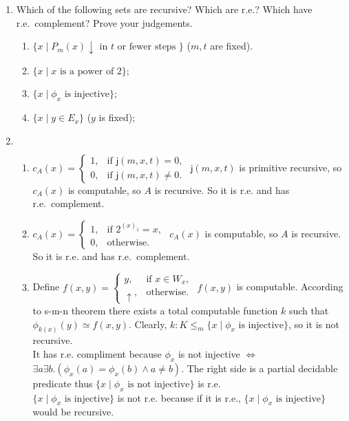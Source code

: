 \documentclass[12pt,a4paper]{article}
\makeatletter
\newtheorem*{solution}{Solution}
\theoremstyle{definition}
\numberwithin{equation}{section}
\numberwithin{figure}{section}
\renewenvironment{solution}[1][Solution] {\par\pushQED{\qed}\normalfont\topsep6\p@\@plus6\p@\relax\trivlist\item[\hskip\labelsep\bfseries#1\@addpunct{.}]\ignorespaces}{\popQED\endtrivlist\@endpefalse} \makeatother
\makeatother
\begin{document}
\begin{enumerate}
\item Which of the following sets are recursive? Which are r.e.? Which have r.e.~complement? Prove your judgements.
  \begin{enumerate}
  \item $\{x \mid P_m(x) \downarrow \mbox{ in } t \mbox{ or fewer steps }\}$ ($m,t$ are fixed).
  \item $\{x \mid x \mbox{ is a power of 2}\}$;
  \item $\{x \mid \phi_x \mbox{ is injective}\}$;
  \item $\{x \mid y\in E_x\}$ ($y$ is fixed);
  \end{enumerate}

  \begin{solution}
  $ $
  \begin{enumerate}
  \item  $c_{A}(x)=\left\{\begin{array}{ll}
         1, & \mbox{if } \textsf{j}(m,x,t)=0,\\
         0, & \mbox{if } \textsf{j}(m,x,t)\neq0.
      \end{array}\right.$
      $\textsf{j}(m,x,t)$ is primitive recursive, so $c_{A}(x)$ is computable, so $A$ is recursive. So it is r.e. and has r.e.~complement.
  \item  $c_{A}(x)=\left\{\begin{array}{ll}
         1, & \mbox{if } 2^{(x)_1}=x,\\
         0, & \mbox{otherwise.}
      \end{array}\right.$
      $c_{A}(x)$ is computable, so $A$ is recursive. So it is r.e. and has r.e.~complement.
  \item Define $f(x,y)=\left\{\begin{array}{ll}
         y, & \mbox{if }x\in W_x,\\
         \uparrow, & \mbox{otherwise}.
      \end{array}\right.$ $f(x,y)$ is computable. According to s-m-n theorem there exists a total computable function $k$ such that $\phi_{k(x)}(y)\simeq f(x,y)$. Clearly, $k:K\leq_m \{x \mid \phi_x \mbox{ is injective}\}$, so it is not recursive.\\
      It has r.e. compliment because $\phi_x$ is not injective $\Leftrightarrow$ $\exists a\exists b.(\phi_x(a)= \phi_x(b) \wedge a\neq b)$. The right side is a partial decidable predicate thus $\{x \mid \phi_x \mbox{ is not injective}\}$ is r.e.\\
      $\{x \mid \phi_x \mbox{ is injective}\}$ is not r.e. because if it is r.e., $\{x \mid \phi_x \mbox{ is injective}\}$ would be recursive.

\end{enumerate}
\end{solution}
\end{enumerate}
\end{document}
